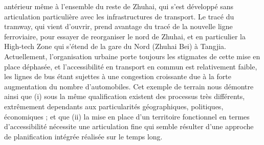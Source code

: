 {antérieur même à l'ensemble du reste de Zhuhai, qui s'est développé sans articulation particulière avec les infrastructures de transport. Le tracé du tramway, qui vient d'ouvrir, prend avantage du tracé de la nouvelle ligne ferroviaire, pour essayer de reorganiser le nord de Zhuhai, et en particulier la High-tech Zone qui s'étend de la gare du Nord (Zhuhai Bei) à Tangjia. Actuellement, l'organisation urbaine porte toujours les stigmates  de cette mise en place déphasée, et l'accessibilité en transport en commun est relativement faible, les lignes de bus étant sujettes à une congestion croissante due à la forte augmentation du nombre d'automobiles. Cet exemple de terrain nous démontre ainsi que (i) sous la même qualification existent des processus très différents, extrêmement dependants aux particularités géographiques, politiques, économiques ; et que (ii) la mise en place d'un territoire fonctionnel en termes d'accessibilité nécessite une articulation fine qui semble résulter d'une approche de planification intégrée réalisée sur le temps long.
}



